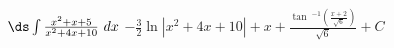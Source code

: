 {$\ds \int \frac{x^2+x+5}{x^2+4x+10}\ dx$}
{$-\frac{3}{2} \ln \left|x^2+4 x+10\right|+x+\frac{\tan \
^{-1}\left(\frac{x+2}{\sqrt{6}}\right)}{\sqrt{6}}+C$}
